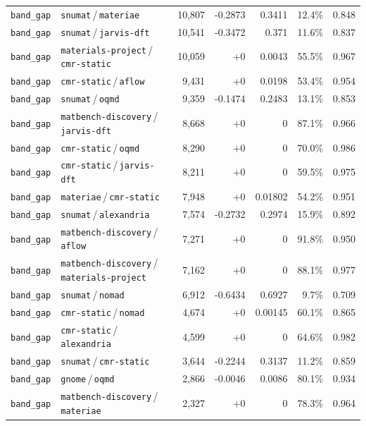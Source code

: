 \begin{longtable}{llrrrrr}
\texttt{band\_gap} & \texttt{snumat}\,/\,\texttt{materiae} & 10{,}807 & -0.2873 & 0.3411 & 12.4\% & 0.848 \\
\texttt{band\_gap} & \texttt{snumat}\,/\,\texttt{jarvis-dft} & 10{,}541 & -0.3472 & 0.371 & 11.6\% & 0.837 \\
\texttt{band\_gap} & \texttt{materials-project}\,/\,\texttt{cmr-static} & 10{,}059 & +0 & 0.0043 & 55.5\% & 0.967 \\
\texttt{band\_gap} & \texttt{cmr-static}\,/\,\texttt{aflow} & 9{,}431 & +0 & 0.0198 & 53.4\% & 0.954 \\
\texttt{band\_gap} & \texttt{snumat}\,/\,\texttt{oqmd} & 9{,}359 & -0.1474 & 0.2483 & 13.1\% & 0.853 \\
\texttt{band\_gap} & \texttt{matbench-discovery}\,/\,\texttt{jarvis-dft} & 8{,}668 & +0 & 0 & 87.1\% & 0.966 \\
\texttt{band\_gap} & \texttt{cmr-static}\,/\,\texttt{oqmd} & 8{,}290 & +0 & 0 & 70.0\% & 0.986 \\
\texttt{band\_gap} & \texttt{cmr-static}\,/\,\texttt{jarvis-dft} & 8{,}211 & +0 & 0 & 59.5\% & 0.975 \\
\texttt{band\_gap} & \texttt{materiae}\,/\,\texttt{cmr-static} & 7{,}948 & +0 & 0.01802 & 54.2\% & 0.951 \\
\texttt{band\_gap} & \texttt{snumat}\,/\,\texttt{alexandria} & 7{,}574 & -0.2732 & 0.2974 & 15.9\% & 0.892 \\
\texttt{band\_gap} & \texttt{matbench-discovery}\,/\,\texttt{aflow} & 7{,}271 & +0 & 0 & 91.8\% & 0.950 \\
\texttt{band\_gap} & \texttt{matbench-discovery}\,/\,\texttt{materials-project} & 7{,}162 & +0 & 0 & 88.1\% & 0.977 \\
\texttt{band\_gap} & \texttt{snumat}\,/\,\texttt{nomad} & 6{,}912 & -0.6434 & 0.6927 & 9.7\% & 0.709 \\
\texttt{band\_gap} & \texttt{cmr-static}\,/\,\texttt{nomad} & 4{,}674 & +0 & 0.00145 & 60.1\% & 0.865 \\
\texttt{band\_gap} & \texttt{cmr-static}\,/\,\texttt{alexandria} & 4{,}599 & +0 & 0 & 64.6\% & 0.982 \\
\texttt{band\_gap} & \texttt{snumat}\,/\,\texttt{cmr-static} & 3{,}644 & -0.2244 & 0.3137 & 11.2\% & 0.859 \\
\texttt{band\_gap} & \texttt{gnome}\,/\,\texttt{oqmd} & 2{,}866 & -0.0046 & 0.0086 & 80.1\% & 0.934 \\
\texttt{band\_gap} & \texttt{matbench-discovery}\,/\,\texttt{materiae} & 2{,}327 & +0 & 0 & 78.3\% & 0.964 \\

\end{longtable}
